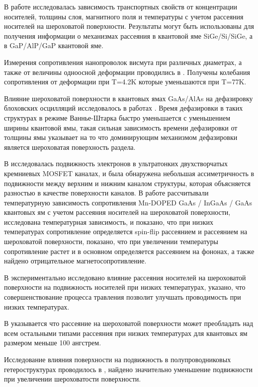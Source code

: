 В работе \cite{Khanh2013} исследовалась зависимость транспортных свойств от концентрации носителей, толщины слоя, магнитного поля и температуры с учетом рассеяния носителей на шероховатой поверхности. Результаты могут быть использованы для получения информации о механизмах рассеяния в квантовой яме SiGe/Si/SiGe, а в \cite{Tai2015} GaP/AlP/GaP квантовой яме.

Измерения сопротивления нанопроволок висмута при различных диаметрах, а также от величины одноосной деформации проводились в \cite{Condrea2010}. Получены колебания сопротивления от деформации при T=4.2K которые уменьшаются при T=77K.

Влияние шероховатой поверхности в квантовых ямах GaAs/AlAs на дефазировку блоховских осцилляций исследовалось в работах \cite{Unuma2006,Unuma2007}. Время дефазировки в таких структурах в режиме Ваннье-Штарка быстро уменьшается с уменьшением ширины квантовой ямы, такая сильная зависимость времени дефазировки от толщины ямы указывает на то что доминирующим механизмом дефазировки является шероховатая поверхность раздела.

В \cite{Prunnila2005} исследовалась подвижность электронов в ультратонких двухстворчатых кремниевых MOSFET каналах, и была обнаружена небольшая ассиметричность в подвижности между верхним и нижним каналом структуры, которая объясняется разностью в качестве поверхности каналов. 
В работе \cite{Shchurova2009} рассчитывали температурную зависимость сопротивления Mn-DOPED GaAs / InGaAs / GaAs квантовых ям с учетом рассеяния носителей на шероховатой поверхности,  исследована температурная зависимость, и показано, что при низких температурах сопротивление определяется spin-flip рассеянием и рассеянием на шероховатой поверхности, показано, что при увеличении температуры сопротивление растет и в основном определяется рассеянием на фононах, а также найдено отрицательное магнетосопротивление.

В \cite{Lee2011b} экспериментально исследовано влияние рассеяния носителей на шероховатой поверхности на подвижность носителей при низких температурах, указано, что совершенствование процесса травления позволит улучшать проводимость при низких температурах.

В \cite{Penner1999} указывается что рассеяние на шероховатой поверхности может преобладать над всем остальными типами рассеяния при низких температурах для квантовых ям размером меньше 100 ангстрем.

Исследование влияния поверхности на подвижность в полупроводниковых гетероструктурах проводилось в \cite{Feenstra1995}, найдено значительно уменьшение подвижности при увеличении шероховатости поверхности.

